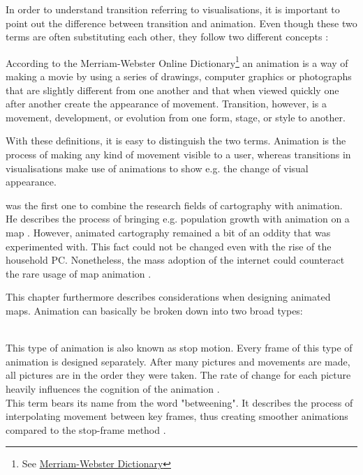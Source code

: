 In order to understand transition referring to visualisations, it is important to point out the difference between transition and animation. Even though these two terms are often substituting each other, they follow two different concepts :

According to the Merriam-Webster Online Dictionary\footnote{See \href{http://www.merriam-webster.com/}{Merriam-Webster Dictionary}} an animation is a way of making a movie by using a series of drawings, computer graphics or photographs that are slightly different from one another and that when viewed quickly one after another create the appearance of movement. Transition, however, is a movement, development, or evolution from one form, stage, or style to another.

With these definitions, it is easy to distinguish the two terms. Animation is the process of making any kind of movement visible to a user, whereas transitions in visualisations make use of animations to show e.g. the change of visual appearance.

\citeauthor{Thrower1959} was the first one to combine the research fields of cartography with animation. He describes the process of bringing e.g. population growth with animation on a map . However, animated cartography remained a bit of an oddity that was experimented with. This fact could not be changed even with the rise of the household \ac{PC}. Nonetheless, the mass adoption of the internet could counteract the rare usage of map animation .

This chapter furthermore describes considerations when designing animated maps. Animation can basically be broken down into two broad types:

\begin{enumerate}
 \hfill \\
This type of animation is also known as stop motion. Every frame of this type of animation is designed separately. After many pictures and movements are made, all pictures are in the order they were taken. The rate of change for each picture heavily influences the cognition of the animation .
 \hfill \\
    This term bears its name from the word "betweening". It describes the process of interpolating movement between key frames, thus creating smoother animations compared to the stop-frame method .
\end{enumerate}

